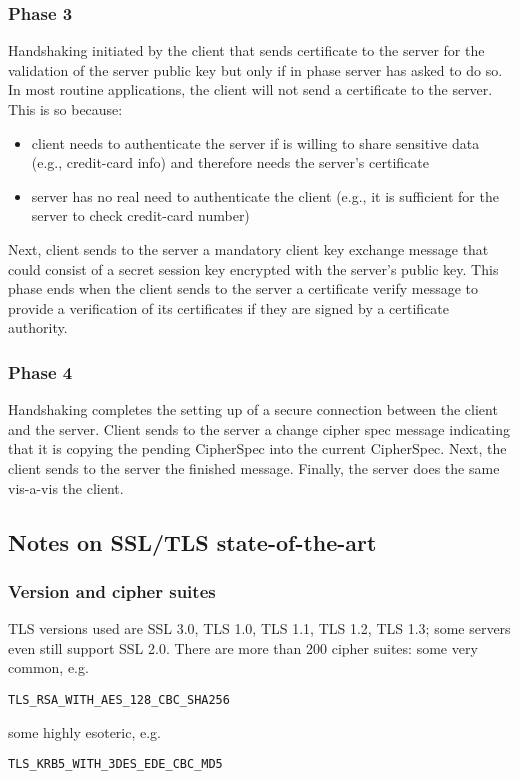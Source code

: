 \documentclass[a4paper, 10pt, titlepage]{article}
\begin{document}
\subsubsection{Phase 3}
Handshaking initiated by the client that sends certificate to the server for the validation of the server public key but only if in phase server has asked to do so. In most routine applications, the client will not send a certificate to the server. This is so because:
\begin{itemize}
\item client needs to authenticate the server if is willing to share sensitive data (e.g., credit-card info) and therefore needs the server’s certificate
\item server has no real need to authenticate the client (e.g., it is sufficient for the server to check credit-card number)
\end{itemize}
Next, client sends to the server a mandatory client key exchange message that could consist of a secret session key encrypted with the server’s public key. This phase ends when the client sends to the server a certificate verify message to provide a verification of its certificates if they are signed by a certificate authority.
\subsubsection{Phase 4}
Handshaking completes the setting up of a secure connection between the client and the server. Client sends to the server a change cipher spec message indicating that it is copying the pending CipherSpec into the current CipherSpec. Next, the client sends to the server the finished message. Finally, the server does the same vis-a-vis the client.

\subsection{Notes on SSL/TLS state-of-the-art}
\subsubsection{Version and cipher suites}
TLS versions used are SSL 3.0, TLS 1.0, TLS 1.1, TLS 1.2, TLS 1.3; some servers even still support SSL 2.0.
There are more than 200 cipher suites: some very common, e.g.
\begin{verbatim}
TLS_RSA_WITH_AES_128_CBC_SHA256
\end{verbatim}
some highly esoteric, e.g.
\begin{verbatim}
TLS_KRB5_WITH_3DES_EDE_CBC_MD5
\end{verbatim}
\end{document}
